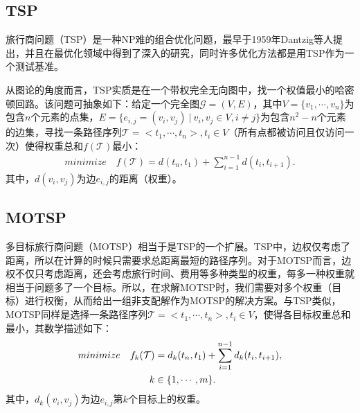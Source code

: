 \subsection{TSP}
\label{subsec:背景介绍:测试问题:TSP}
旅行商问题（TSP）是一种NP难的组合优化问题\cite{johnson1990traveling,baraglia2001hybrid,johnson2007experimental}，最早于1959年Dantzig等人提出，并且在最优化领域中得到了深入的研究，同时许多优化方法都是用TSP作为一个测试基准。
\par
从图论的角度而言，TSP实质是在一个带权完全无向图中，找一个权值最小的哈密顿回路。该问题可抽象如下：给定一个完全图$\mathcal{G}=(V,E)$，其中$V = \{ v_1, \cdots, v_n \}$为包含$n$个元素的点集，$E = \{ e_{i,j} = (v_i,v_j) \ | \ v_i,v_j \in V, i \not = j \}$为包含$n^2-n$个元素的边集，寻找一条路径序列$\mathcal{T} = <t_1, \cdots, t_n>, t_i \in V $（所有点都被访问且仅访问一次）使得权重总和$f(\mathcal{T})$最小：
\begin{align}
    \label{eq:TSP}
    minimize \quad f(\mathcal{T}) = d(t_n,t_1) + \sum_{i=1}^{n-1} d(t_i,t_{i+1}).
\end{align}
其中，$d(v_i, v_j)$为边$e_{i,j}$的距离（权重）。

\subsection{MOTSP}
\label{subsec:背景介绍:测试问题:MOTSP}
多目标旅行商问题（MOTSP）相当于是TSP的一个扩展。TSP中，边权仅考虑了距离，所以在计算的时候只需要求总距离最短的路径序列。对于MOTSP而言，边权不仅只考虑距离，还会考虑旅行时间、费用等多种类型的权重，每多一种权重就相当于问题多了一个目标。所以，在求解MOTSP时，我们需要对多个权重（目标）进行权衡，从而给出一组非支配解作为MOTSP的解决方案。与TSP类似，MOTSP同样是选择一条路径序列$\mathcal{T} = <t_1, \cdots, t_n>, t_i \in V $，使得各目标权重总和最小，其数学描述如下：
\begin{align}
    \label{eq:MOTSP}
    minimize \quad f_k(\mathcal{T}) & = d_k(t_n,t_1) + \sum_{i=1}^{n-1} d_k(t_i,t_{i+1}), \\
    k & \in \{1, \cdots, m\}. \notag
\end{align}
其中，$d_k(v_i, v_j)$为边$e_{i,j}$第$k$个目标上的权重。

